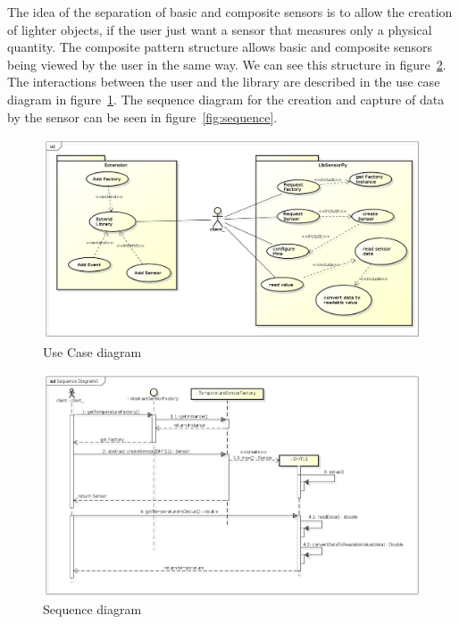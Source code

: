 \documentclass{acm_proc_article-sp}
\begin{document}
The idea of the separation of basic and composite sensors is to allow the creation of lighter objects, if the user just want a sensor that measures only a physical quantity. The composite pattern structure allows basic and composite sensors being viewed by the user in the same way. We can see this structure in figure~\ref{fig:composite}.
\newline
\newline
The interactions between the user and the library are described in the use case diagram  in figure~\ref{fig:useCase}. The sequence diagram for the creation and capture of data by the sensor can be seen in figure~\ref{fig:sequence}.
\begin{figure}[ht]
    \includegraphics[width=1.0\textwidth,natwidth=610,natheight=642]{pictures/UseCaseDiagram.png}
    \caption{Use Case diagram}
    \label{fig:useCase}
\end{figure}

\begin{figure}[t]
    \includegraphics[width=1.0\textwidth,natwidth=610,natheight=642]{pictures/SequenceDiagram3.png}
    \caption{Sequence diagram}
    \label{fig:composite}
\end{figure}
\end{document}

